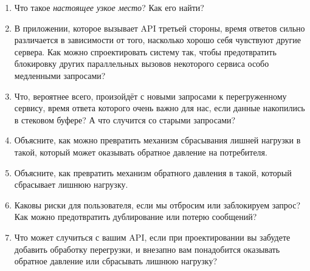 \documentclass[11pt, oneside]{book}   	%
\begin{document}
\begin{enumerate}
	\item Что такое \emph{настоящее узкое место}? Как его найти?
	\item В приложении, которое вызывает API третьей стороны, время ответов сильно различается в зависимости от того, насколько хорошо себя чувствуют другие сервера. Как можно спроектировать систему так, чтобы предотвратить блокировку других параллельных вызовов некоторого сервиса особо медленными запросами?
	\item Что, вероятнее всего, произойдёт с новыми запросами к перегруженному сервису, время ответа которого очень важно для нас, если данные накопились в стековом буфере? А что случится со старыми запросами?
	\item Объясните, как можно превратить механизм сбрасывания лишней нагрузки в такой, который может оказывать обратное давление на потребителя.
	\item Объясните, как превратить механизм обратного давления в такой, который сбрасывает лишнюю нагрузку.
	\item Каковы риски для пользователя, если мы отбросим или заблокируем запрос? Как можно предотвратить дублирование или потерю сообщений?
	\item Что может случиться с вашим API, если при проектировании вы забудете добавить обработку перегрузки, и внезапно вам понадобится оказывать обратное давление или сбрасывать лишнюю нагрузку?
\end{enumerate}
\end{document}
